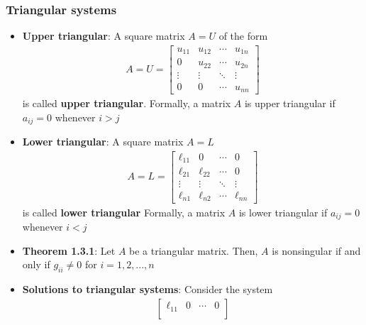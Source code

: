 \documentclass{report}
\begin{document}
    \subsubsection{Triangular systems}
    \begin{itemize}
        \item \textbf{Upper triangular}: A square matrix $A = U$ of the form 
            \begin{align*}
                A = U = \begin{bmatrix}
                    u_{11} & u_{12} & \cdots & u_{1n} \\
                    0 & u_{22} & \cdots & u_{2n} \\
                    \vdots & \vdots & \ddots & \vdots \\
                    0 & 0 & \cdots & u_{nn}
                \end{bmatrix}
            \end{align*}
            is called \textbf{upper triangular}.
            \bigbreak \noindent 
            Formally, a matrix $A$ is upper triangular if $a_{ij} = 0 $ whenever $i > j $
        \item \textbf{Lower triangular}: A square matrix $A = L$
            \begin{align*}
                A = L = \begin{bmatrix}
                    \ell_{11} & 0 & \cdots & 0 \\
                    \ell_{21} & \ell_{22} & \cdots & 0 \\
                    \vdots & \vdots & \ddots & \vdots \\
                    \ell_{n1} & \ell_{n2} & \cdots & \ell_{nn}
                \end{bmatrix}
            \end{align*}
            is called \textbf{lower triangular}
            \bigbreak \noindent 
            Formally, a matrix $A$ is lower triangular if $a_{ij} = 0 $ whenever $i < j $
        \item \textbf{Theorem 1.3.1}: Let $A$ be a triangular matrix. Then, $A$ is nonsingular if and only if $g_{ii} \ne 0$ for $i=1,2,...,n $
        \item \textbf{Solutions to triangular systems}: 
            Consider the system
            \begin{align*}
               \begin{bmatrix}
                    \ell_{11} & 0 & \cdots & 0 \\

\end{bmatrix}
\end{align*}
\end{itemize}
\end{document}
